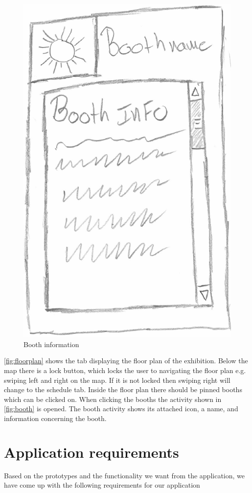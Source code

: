 \begin{figure}[H]
\begin{minipage}[b]{0.5\columnwidth}
\includegraphics[width=0.7\columnwidth]{img/prototype/8.png}
\caption{Booth information\label{fig:booth}}
\end{minipage}
\end{figure}

\autoref{fig:floorplan} shows the tab displaying the floor plan of the exhibition. Below the map there is a lock button, which locks the user to navigating the floor plan e.g. swiping left and right on the map. If it is not locked then swiping right will change to the schedule tab. Inside the floor plan there should be pinned booths which can be clicked on. When clicking the booths the activity shown in \autoref{fig:booth} is opened. The booth activity shows its attached icon, a name, and information concerning the booth.

\section*{Application requirements}
Based on the prototypes and the functionality we want from the application, we have come up with the following requirements for our application

